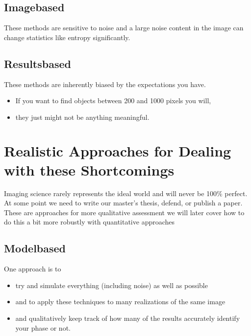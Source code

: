 \documentclass[letterpaper,10pt,english]{sphinxmanual}
\begin{document}
\subsection{Image\sphinxhyphen{}based}
\label{\detokenize{05-AdvancedSegmentation:image-based}}
\sphinxAtStartPar
These methods are sensitive to noise and a large noise content in the image can change statistics like entropy significantly.


\subsection{Results\sphinxhyphen{}based}
\label{\detokenize{05-AdvancedSegmentation:results-based}}
\sphinxAtStartPar
These methods are inherently biased by the expectations you have.
\begin{itemize}
\item {} 
\sphinxAtStartPar
If you want to find objects between 200 and 1000 pixels you will,

\item {} 
\sphinxAtStartPar
they just might not be anything meaningful.

\end{itemize}


\section{Realistic Approaches for Dealing with these Shortcomings}
\label{\detokenize{05-AdvancedSegmentation:realistic-approaches-for-dealing-with-these-shortcomings}}
\sphinxAtStartPar
Imaging science rarely represents the ideal world and will never be 100\% perfect. At some point we need to write our master’s thesis, defend, or publish a paper. These are approaches for more qualitative assessment we will later cover how to do this a bit more robustly with quantitative approaches


\subsection{Model\sphinxhyphen{}based}
\label{\detokenize{05-AdvancedSegmentation:model-based}}
\sphinxAtStartPar
One approach is to
\begin{itemize}
\item {} 
\sphinxAtStartPar
try and simulate everything (including noise) as well as possible

\item {} 
\sphinxAtStartPar
and to apply these techniques to many realizations of the same image

\item {} 
\sphinxAtStartPar
and qualitatively keep track of how many of the results accurately identify your phase or not.

\end{itemize}
\end{document}
